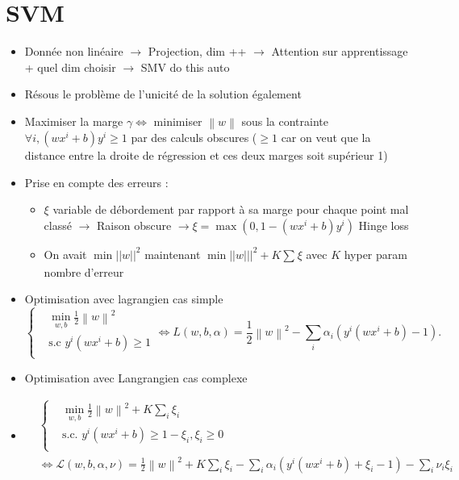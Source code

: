 \documentclass{article}
\begin{document}
\section{SVM}
\begin{itemize}
    \item Donnée non linéaire $\rightarrow$ Projection, dim ++ $\rightarrow$ Attention sur apprentissage + quel dim choisir $\rightarrow$ SMV do this auto
    \item Résous le problème de l'unicité de la solution également
    \item Maximiser la marge $ \gamma  \Leftrightarrow $ minimiser $ \left\| w \right\| $ sous la contrainte $ \forall i, (wx^i + b)y^i \geq 1 $ par des calculs obscures ($ \geq 1 $ car on veut que la distance entre la droite de régression et ces deux marges soit supérieur 1)
    \item Prise en compte des erreurs : \begin{itemize}
        \item $ \xi  $ variable de débordement par rapport à sa marge pour chaque point mal classé $\rightarrow$ Raison obscure $\rightarrow \xi = \max (0, 1 - (wx^i + b) y^i) $ Hinge loss
        \item On avait $\min ||w||^2$ maintenant $\min ||w|||^2 + K \sum_{}^{}\xi $ avec $K$ hyper param nombre d'erreur
    \end{itemize}
    \item Optimisation avec lagrangien cas simple
    \[
        \begin{cases}
            & \min _{w,b} \frac{1}{2}\left\| w \right\| ^2\\
        &\text{s.c } y^i (wx^i + b) \geq 1\\
    \end{cases} 
        \Leftrightarrow L(w, b, \alpha) = \frac{1}{2} \left\| w \right\| ^2 - \sum_{i}^{}\alpha _i (y^i (wx^i + b) - 1)
    .\]
    \item Optimisation avec Langrangien cas complexe 
    \item \begin{align*}
        &\begin{cases}
            &\min _{w,b} \frac{1}{2}\left\| w \right\| ^2 + K \sum_{i}^{}\xi _i \\
            &\text{s.c. } y^i (wx^i + b) \geq 1 - \xi _i, \xi _i \geq 0 \\
        \end{cases} \\ 
        &\Leftrightarrow \mathcal{L}(w, b, \alpha , \nu ) = \frac{1}{2}\left\| w \right\| ^2 + K \sum_{i}^{} \xi _i - \sum_{i}^{}\alpha _i (y^i(w x^i + b) + \xi _i - 1) - \sum_{i}^{}\nu _i \xi _i 
    \end{align*}
        
\end{itemize}
\end{document}
